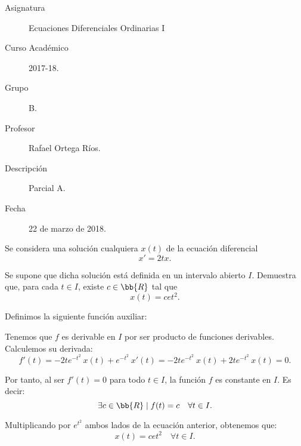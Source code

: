 \documentclass[12pt]{article}
\begin{document}

    
    

    \begin{description}
        \item[Asignatura] Ecuaciones Diferenciales Ordinarias I
        \item[Curso Académico] 2017-18.
        \item[Grupo] B.
        \item[Profesor] Rafael Ortega Ríos.
        \item[Descripción] Parcial A.
        \item[Fecha] 22 de marzo de 2018.
    
    \end{description}
    \newpage
    
\begin{ejercicio}
    Se considera una solución cualquiera \(x(t)\) de la ecuación diferencial
    \[
        x' = 2tx.
    \]

    Se supone que dicha solución está definida en un intervalo abierto \(I\). Demuestra que, para cada $t\in I$, existe \(c \in \bb{R}\) tal que
    \[
        x(t) = cet^2.
    \]

    Definimos la siguiente función auxiliar:

    Tenemos que \(f\) es derivable en \(I\) por ser producto de funciones derivables. Calculemos su derivada:
    \begin{equation*}
        f'(t) = -2te^{-t^2}~x(t) + e^{-t^2}~x'(t) = -2te^{-t^2}~x(t) + 2te^{-t^2}~x(t) = 0.
    \end{equation*}

    Por tanto, al ser $f'(t)=0$ para todo \(t\in I\), la función \(f\) es constante en \(I\). Es decir:
    \begin{equation*}
        \exists c \in \bb{R} \mid f(t) = c \quad \forall t \in I.
    \end{equation*}

    Multiplicando por $e^{t^2}$ ambos lados de la ecuación anterior, obtenemos que:
    \begin{equation*}
        x(t) = cet^2 \quad \forall t \in I.
    \end{equation*}
\end{ejercicio}
\end{document}
